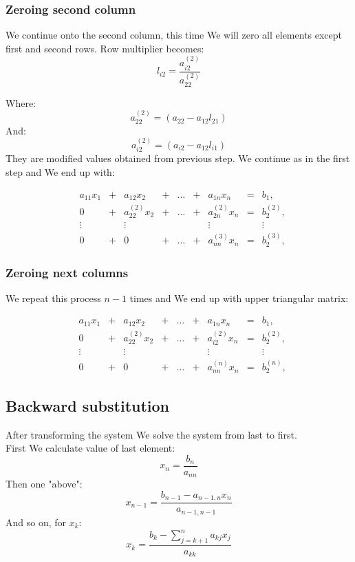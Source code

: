\documentclass{report}
\begin{document}
\subsubsection{Zeroing second column}
We continue onto the second column, this time We will zero all elements except first and second rows.
Row multiplier becomes:
\[ l_{i2} = \frac{ a_{i2}^{(2)} }{ a_{22}^{(2)} } \]

Where:
\[ a_{22}^{(2)} = (a_{22} - a_{12}l_{21}) \]
And:
\[ a_{i2}^{(2)} = (a_{i2} - a_{12}l_{i1}) \]
They are modified values obtained from previous step.
We continue as in the first step and We end up with:

\[
\begin{matrix}

&a_{11}x_1 &{}+&a_{12}x_2&+&\dots&+&a_{1n}x_n &=&b_1,\\

&0 &{}+& a_{22}^{(2)}x_2&{}+&\dots&{}+& a_{2n}^{(2)}x_n &=&b_2^{(2)},\\

&\vdots    &&\vdots      & &     & &  \vdots  & &\vdots\\

&0 &{}+& 0 &{}+&\dots&{}+& a_{nn}^{(3)}x_n &=&b_2^{(3)},

\end{matrix}
\]

\subsubsection{Zeroing next columns}
We repeat this process $n-1$ times and We end up with upper triangular matrix:

\[
\begin{matrix}

&a_{11}x_1 &{}+&a_{12}x_2&+&\dots&+&a_{1n}x_n &=&b_1,\\

&0 &{}+& a_{22}^{(2)}x_2&{}+&\dots&{}+& a_{i2}^{(2)}x_n &=&b_2^{(2)},\\

&\vdots    &&\vdots      & &     & &  \vdots  & &\vdots\\

&0 &{}+& 0 &{}+&\dots&{}+& a_{nn}^{(n)}x_n &=&b_2^{(n)},

\end{matrix}
\]

\subsection{Backward substitution}
After transforming the system We solve the system from last to first. \\
First We calculate value of last element:
\[ x_n = \frac{b_n}{a_{nn}} \]
Then one "above":
\[ x_{n-1} = \frac{ b_{n-1} - a_{n-1, n}x_n}{a_{n-1, n-1}} \]
And so on, for $x_k$:
\[ x_{k} = \frac{b_k - \sum_{j = k + 1}^n a_{kj}x_j}{a_{kk}} \]
\end{document}
